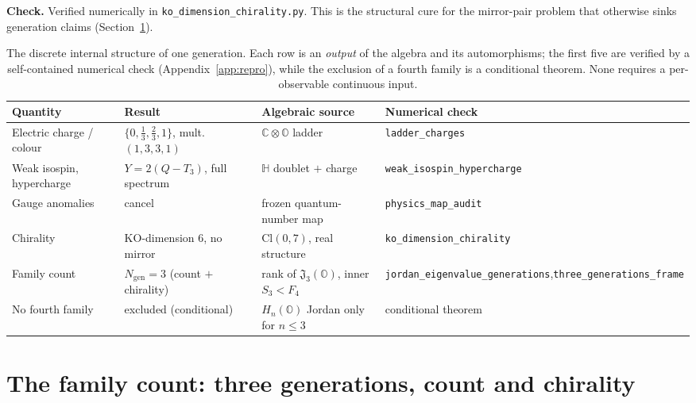 \documentclass[11pt,a4paper]{article}
\newcommand{\bcode}[1]{\texttt{\small #1}}
\theoremstyle{plain}
\newcommand{\JO}{\mathfrak{J}_3(\mathbb{O})}
\newcommand{\Cl}{\mathrm{Cl}}
\newcommand{\code}[1]{\texttt{#1}}
\begin{document}
\noindent\textbf{Check.} Verified numerically in \code{ko\_dimension\_chirality.py}.
This is the structural cure for the mirror-pair problem that otherwise sinks
generation claims (Section~\ref{sec:threegen}).

\begin{table}[t]
\centering
\footnotesize
\setlength{\tabcolsep}{4pt}
\renewcommand{\arraystretch}{1.25}
\begin{tabular}{@{}L{2.9cm}L{3.1cm}L{2.9cm}L{4.0cm}@{}}
\toprule
\textbf{Quantity} & \textbf{Result} & \textbf{Algebraic source} & \textbf{Numerical check} \\
\midrule
Electric charge / colour & $\{0,\tfrac13,\tfrac23,1\}$, mult.\ $(1,3,3,1)$ & $\mathbb{C}\otimes\mathbb{O}$ ladder & \bcode{ladder\_charges} \\
Weak isospin, hypercharge & $Y = 2(Q-T_3)$, full spectrum & $\mathbb{H}$ doublet $+$ charge & \bcode{weak\_isospin\_}\newline\bcode{hypercharge} \\
Gauge anomalies & cancel & frozen quantum-number map & \bcode{physics\_map\_audit} \\
Chirality & KO-dimension $6$, no mirror & $\Cl(0,7)$, real structure & \bcode{ko\_dimension\_}\newline\bcode{chirality} \\
Family count & $N_{\mathrm{gen}}=3$ (count $+$ chirality) & rank of $\JO$, inner $S_3<F_4$ & \bcode{jordan\_eigenvalue\_}\newline\bcode{generations},\newline\bcode{three\_generations\_}\newline\bcode{frame} \\
No fourth family & excluded (conditional) & $H_n(\mathbb{O})$ Jordan only for $n\le 3$ & conditional theorem \\
\bottomrule
\end{tabular}
\caption{The discrete internal structure of one generation. Each row is an
\emph{output} of the algebra and its automorphisms; the first five are verified by
a self-contained numerical check (Appendix~\ref{app:repro}), while the exclusion
of a fourth family is a conditional theorem. None requires a per-observable
continuous input.}
\label{tab:witnesses}
\end{table}

\section{The family count: three generations, count and chirality}
\label{sec:threegen}
\end{document}
